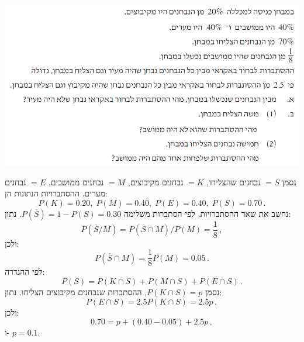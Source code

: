 \documentclass[12pt,a4paper]{article}
\begin{document}
\newpage

\textbf{}

\begin{center}
\includegraphics[width=.95\textwidth]{summer-2016a-3}
\end{center}

נסמן 
$=S$
נבחנים שהצליחו,
$=K$
נבחנים מקיבוצים,
$=M$
נבחנים ממושבים,
$=E$
נבחנים מערים. ההסתברויות הנתונות הן:
\[
P(K)=0.20,\;P(M)=0.40,\;P(E)=0.40,\;P(S)=0.70\,.
\]
נחשב את שאר ההסתברויות. לפי הסתברות משלימה
$P(\overline{S})=1-P(S)=0.30$.
נתון:
\[
P(\overline{S}/M)=P(\overline{S}\cap M) / P(M)=\frac{1}{8}\,,
\]
ולכן:
\[
P(\overline{S}\cap M)=\frac{1}{8}P(M)=0.05\,.
\]
לפי ההגדרה:
\[
P(S)=P(K\cap S) + P(M\cap S) + P(E\cap S)\,.
\]
נסמן
$P(K\cap S)=p$,
ההסתברות שנבחנים מקיבוצים הצליחו. נתון:
\[
P(E\cap S)=2.5P(K\cap S)=2.5p\,,
\]
ולכן:
\[
0.70=p+(0.40-0.05)+2.5p\,,
\]
ו-%
$p=0.1$.
\end{document}
